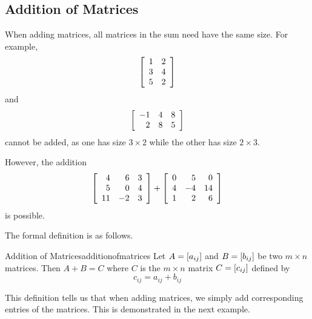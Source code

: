 \subsection{Addition of Matrices}

When adding matrices, all matrices in the sum need have the same size.
For example,
\begin{equation*}
\left[
\begin{array}{rr}
1 & 2 \\
3 & 4 \\
5 & 2
\end{array}
\right] 
\end{equation*}
and
\begin{equation*}
\left[
\begin{array}{rrr}
-1 & 4 & 8\\
2 & 8 & 5
\end{array}
\right] 
\end{equation*}
cannot be added, as one has size $3 \times 2$ while the other has size $2 \times 3$.

However, the addition
\begin{equation*}
\left[
\begin{array}{rrr}
4 & 6 & 3\\
5 & 0 & 4\\
11 & -2 & 3
\end{array}
\right] 
+
\left[
\begin{array}{rrr}
0 & 5 & 0 \\
4 & -4 & 14 \\
1 & 2 & 6
\end{array}
\right]
\end{equation*}
is possible.

The formal definition is as follows.

\begin{definition}{Addition of Matrices}{additionofmatrices}
Let $A=\left[ a_{ij}\right] $ and $B=\left[ b_{ij}\right] $ be two
$m\times n$ matrices. Then $A+B=C$  where $C$ is the $m \times n$
matrix $C=\left[ c_{ij}\right]$ defined by
\begin{equation*}
c_{ij}=a_{ij}+b_{ij}
\end{equation*}

\end{definition}

This definition tells us that when adding matrices, we simply add corresponding entries of the matrices. 
This is demonstrated in the next example. 

